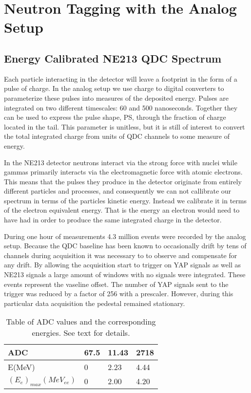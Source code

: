 \documentclass[main.tex]{subfiles}
\begin{document}
\section{Neutron Tagging with the Analog Setup}
\subsection{Energy Calibrated NE213 QDC Spectrum}
Each particle interacting in the detector will leave a footprint in the form of a pulse of charge. In the analog setup we use charge to digital converters to parameterize these pulses into measures of the deposited energy. Pulses are integrated on two different timescales: 60 and 500 nanoseconds. Together they can be used to express the pulse shape, PS, through the fraction of charge located in the tail. This parameter is unitless, but it is still of interest to convert the total integrated charge from units of QDC channels to some measure of energy.

In the NE213 detector neutrons interact via the strong force with nuclei while gammas primarily interacts via the electromagnetic force with atomic electrons. This means that the pulses they produce in the detector originate from entirely different particles and processes, and consequently we can not callibrate our spectrum in terms of the particles kinetic energy. Instead we calibrate it in terms of the electron equivalent energy. That is the energy an electron would need to have had in order to produce the same integrated charge in the detector.

During one hour of measurements 4.3 million events were recorded by the analog setup. Because the QDC baseline has been known to occasionally drift by tens of channels during acquisition it was necessary to to observe and compensate for any drift. By allowing the acquisition start to trigger on YAP signals as well as NE213 signals a large amount of windows with no signals were integrated. These events represent the vaseline offset. The number of YAP signals sent to the trigger was reduced by a factor of 256 with a prescaler. However, during this particular data acquisition the pedestal remained stationary.

\begin{table}[hb]
	\center
	\begin{tabular}{|l|l|l|l|}
	\hline
	ADC             & 67.5 & 11.43 & 2718 \\
	\hline
	E(MeV)          & 0    & 2.23  & 4.44 \\
	\hline
	$(E_{e})_{max}(MeV_{ee})$ & 0    & 2.00  & 4.20 \\
	\hline
	\end{tabular}
	\label{tab:knox}
   	\captionsetup{width=0.435\linewidth}
	\caption{Table of ADC values and the corresponding energies. See text for details.}
\end{table}
\end{document}
